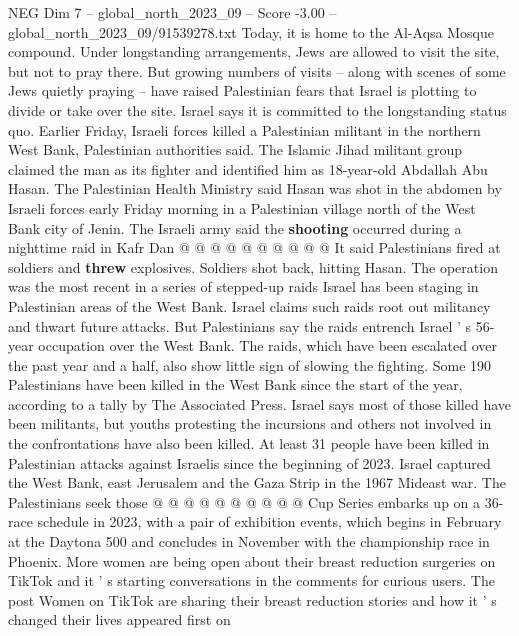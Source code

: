 \begin{textsample}{NEG Dim 7 – global\_north\_2023\_09 – Score -3.00 – global\_north\_2023\_09/91539278.txt}
Today, it is home to the Al-Aqsa Mosque compound.
Under longstanding arrangements, Jews are allowed to visit the site, but not to pray there.
But growing numbers of visits -- along with scenes of some Jews quietly praying -- have raised Palestinian fears that Israel is plotting to divide or take over the site.
Israel says it is committed to the longstanding status quo.
Earlier Friday, Israeli forces killed a Palestinian militant in the northern West Bank, Palestinian authorities said.
The Islamic Jihad militant group claimed the man as its fighter and identified him as 18-year-old Abdallah Abu Hasan.
The Palestinian Health Ministry said Hasan was shot in the abdomen by Israeli forces early Friday morning in a Palestinian village north of the West Bank city of Jenin.
The Israeli army said the \textbf{shooting} occurred during a nighttime raid in Kafr Dan @ @ @ @ @ @ @ @ @ @ It said Palestinians fired at soldiers and \textbf{threw} explosives.
Soldiers shot back, hitting Hasan.
The operation was the most recent in a series of stepped-up raids Israel has been staging in Palestinian areas of the West Bank.
Israel claims such raids root out militancy and thwart future attacks.
But Palestinians say the raids entrench Israel ' s 56-year occupation over the West Bank.
The raids, which have been escalated over the past year and a half, also show little sign of slowing the fighting.
Some 190 Palestinians have been killed in the West Bank since the start of the year, according to a tally by The Associated Press.
Israel says most of those killed have been militants, but youths protesting the incursions and others not involved in the confrontations have also been killed.
At least 31 people have been killed in Palestinian attacks against Israelis since the beginning of 2023.
Israel captured the West Bank, east Jerusalem and the Gaza Strip in the 1967 Mideast war.
The Palestinians seek those @ @ @ @ @ @ @ @ @ @ Cup Series embarks up on a 36-race schedule in 2023, with a pair of exhibition events, which begins in February at the Daytona 500 and concludes in November with the championship race in Phoenix.
More women are being open about their breast reduction surgeries on TikTok and it ' s starting conversations in the comments for curious users.
The post Women on TikTok are sharing their breast reduction stories and how it ' s changed their lives appeared first on

\end{textsample}
